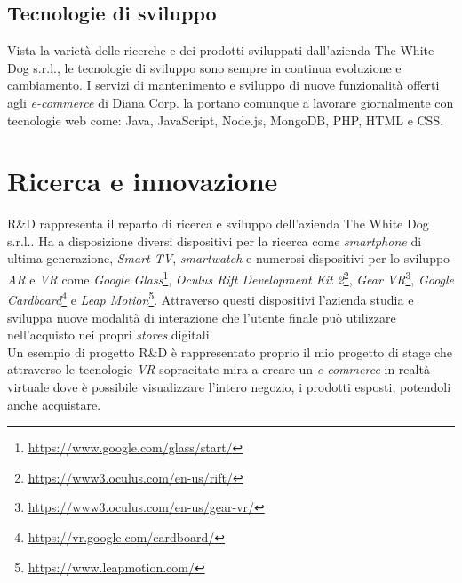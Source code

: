 \subsection{Tecnologie di sviluppo}

Vista la varietà delle ricerche e dei prodotti sviluppati dall'azienda The White Dog s.r.l., le tecnologie di sviluppo sono sempre in continua evoluzione e cambiamento. I servizi di mantenimento e sviluppo di nuove funzionalità offerti agli \textit{e-commerce} di Diana Corp. la portano  comunque a lavorare giornalmente con tecnologie web come: Java, JavaScript, Node.js, MongoDB, PHP, HTML e CSS.

\section{Ricerca e innovazione}

R\&D rappresenta il reparto di ricerca e sviluppo dell'azienda The White Dog s.r.l..
Ha a disposizione diversi dispositivi per la ricerca come \textit{smartphone} di ultima generazione, \textit{Smart TV}, \textit{smartwatch} e numerosi dispositivi per lo sviluppo \textit{AR} e \textit{VR} come \textit{Google Glass}\footnote[8]{\url{https://www.google.com/glass/start/}}, \textit{Oculus Rift Development Kit 2}\footnote[9]{\url{https://www3.oculus.com/en-us/rift/}}, \textit{Gear VR}\footnote[10]{\url{https://www3.oculus.com/en-us/gear-vr/}}, \textit{Google Cardboard}\footnote[11]{\url{https://vr.google.com/cardboard/}} e \textit{Leap Motion}\footnote[12]{\url{https://www.leapmotion.com/}}. Attraverso questi dispositivi l'azienda studia e sviluppa nuove modalità di interazione che l'utente finale può utilizzare nell'acquisto nei propri \textit{stores} digitali. \\
Un esempio di progetto R\&D è rappresentato proprio il mio progetto di stage che attraverso le tecnologie \textit{VR} sopracitate mira a creare un \textit{e-commerce} in realtà virtuale dove è possibile visualizzare l'intero negozio, i prodotti esposti, potendoli anche acquistare.

